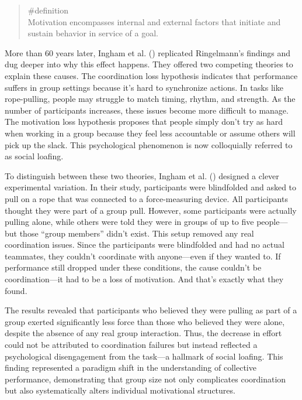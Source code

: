 \documentclass[
  letterpaper,
]{book}
\begin{document}
\begin{quote}
\label{def-motivation}{\#definition}\\
Motivation encompasses internal and external factors that initiate and
sustain behavior in service of a goal.
\end{quote}

More than 60 years later, Ingham et al.
() replicated Ringelmann's
findings and dug deeper into why this effect happens. They offered two
competing theories to explain these causes. The coordination loss
hypothesis indicates that performance suffers in group settings because
it's hard to synchronize actions. In tasks like rope-pulling, people may
struggle to match timing, rhythm, and strength. As the number of
participants increases, these issues become more difficult to manage.
The motivation loss hypothesis proposes that people simply don't try as
hard when working in a group because they feel less accountable or
assume others will pick up the slack. This psychological phenomenon is
now colloquially referred to as social loafing.

To distinguish between these two theories, Ingham et al.
() designed a clever
experimental variation. In their study, participants were blindfolded
and asked to pull on a rope that was connected to a force-measuring
device. All participants thought they were part of a group pull.
However, some participants were actually pulling alone, while others
were told they were in groups of up to five people---but those ``group
members'' didn't exist. This setup removed any real coordination issues.
Since the participants were blindfolded and had no actual teammates,
they couldn't coordinate with anyone---even if they wanted to. If
performance still dropped under these conditions, the cause couldn't be
coordination---it had to be a loss of motivation. And that's exactly
what they found.

The results revealed that participants who believed they were pulling as
part of a group exerted significantly less force than those who believed
they were alone, despite the absence of any real group interaction.
Thus, the decrease in effort could not be attributed to coordination
failures but instead reflected a psychological disengagement from the
task---a hallmark of social loafing. This finding represented a paradigm
shift in the understanding of collective performance, demonstrating that
group size not only complicates coordination but also systematically
alters individual motivational structures.
\end{document}
